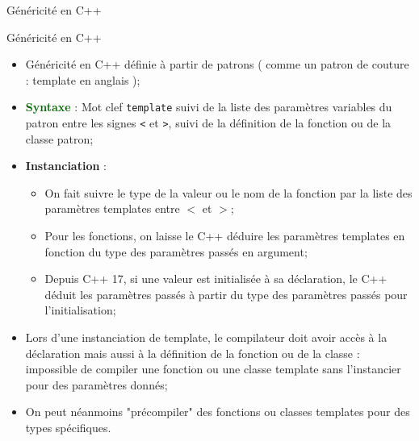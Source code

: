 \documentclass[compress,10pt,aspectratio=169]{beamer}
\begin{document}
  \begin{frame}[fragile]{Généricité en C++}
    \scriptsize\vspace*{-3mm}
    \begin{block}{\small Généricité en C++}
      \begin{itemize}
      \item Généricité en C++ définie à partir de patrons ( comme un patron de couture : 
            template en anglais );
      \item \textbf{\textcolor{DarkGreen}{Syntaxe}} : Mot clef  \texttt{template} suivi de 
            la liste des paramètres variables du patron entre les signes \texttt{<}
            et \texttt{>}, suivi de la définition de la fonction ou de la classe patron;
      \item \textbf{Instanciation} : 
        \begin{itemize}
        \scriptsize
        \item On fait suivre le type de la valeur ou le nom de la fonction par la liste des paramètres 
              templates entre $<$ et $>$;
        \item Pour les fonctions, on laisse le C++ déduire les paramètres templates en fonction du type
              des paramètres passés en argument;
        \item Depuis C++ 17, si une valeur est initialisée à sa déclaration, le C++ déduit les 
              paramètres passés à partir du type des paramètres passés pour l'initialisation;
        \end{itemize}
      \item Lors d'une instanciation de template, le compilateur doit avoir accès à la déclaration 
            mais aussi à la définition de la fonction ou de la classe : impossible de compiler 
            une fonction ou une classe template sans l'instancier pour des paramètres donnés;
      \item On peut néanmoins "précompiler" des fonctions ou classes templates pour des types
            spécifiques.
      \end{itemize}
    \end{block}
  \end{frame}
\end{document}
